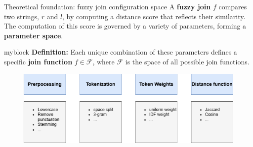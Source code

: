 \documentclass[8pt]{beamer} %
\begin{document}
\begin{frame}{Theoretical foundation: fuzzy join configuration space}
	A \textbf{fuzzy join} $f$ compares two strings, $r$ and $l$, by computing a distance score that reflects their similarity. The computation of this score is governed by a variety of parameters, forming a \textbf{parameter space}. 
	
	\begin{beamercolorbox}[rounded=true, shadow=true, leftskip=1em, rightskip=1em]{myblock}
		\textbf{Definition:} Each unique combination of these parameters defines a specific \textbf{join function} $f \in \mathcal{F}$, where $\mathcal{F}$ is the space of all possible join functions.
	\end{beamercolorbox}
	
	\begin{figure}
		\centering
				\includegraphics[width=0.7\linewidth]{img/join_configuration.png}
	\end{figure}
\end{frame}
\end{document}
